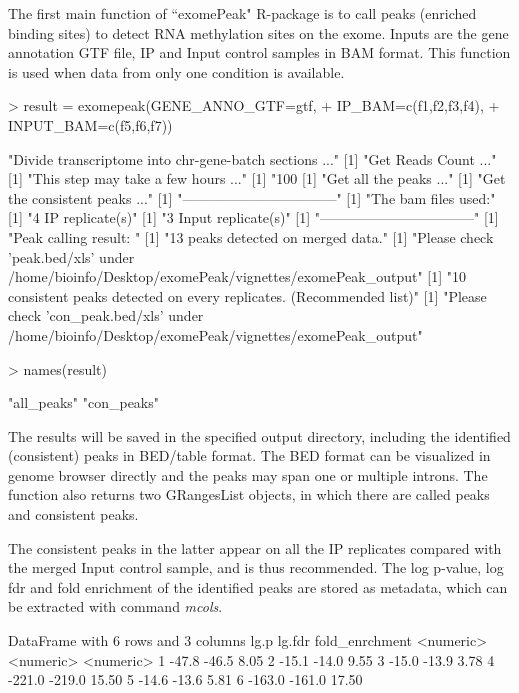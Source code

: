 \documentclass[]{article}
\begin{document}
The first main function of ``exomePeak" R-package is to call peaks (enriched binding sites) to detect RNA methylation sites on the exome. Inputs are the gene annotation GTF file, IP and Input control samples in BAM format. This function is used when data from only one condition is available.

\begin{Schunk}
\begin{Sinput}
> result = exomepeak(GENE_ANNO_GTF=gtf, 
+                    IP_BAM=c(f1,f2,f3,f4), 
+                    INPUT_BAM=c(f5,f6,f7))
\end{Sinput}
\begin{Soutput}
[1] "Divide transcriptome into chr-gene-batch sections ..."
[1] "Get Reads Count ..."
[1] "This step may take a few hours ..."
[1] "100 %"
[1] "Get all the peaks ..."
[1] "Get the consistent peaks ..."
[1] "---------------------------------"
[1] "The bam files used:"
[1] "4 IP replicate(s)"
[1] "3 Input replicate(s)"
[1] "---------------------------------"
[1] "Peak calling result: "
[1] "13 peaks detected on merged data."
[1] "Please check 'peak.bed/xls' under /home/bioinfo/Desktop/exomePeak/vignettes/exomePeak_output"
[1] "10 consistent peaks detected on every replicates. (Recommended list)"
[1] "Please check 'con_peak.bed/xls' under /home/bioinfo/Desktop/exomePeak/vignettes/exomePeak_output"
\end{Soutput}
\begin{Sinput}
> names(result)
\end{Sinput}
\begin{Soutput}
[1] "all_peaks" "con_peaks"
\end{Soutput}
\end{Schunk}

The results will be saved in the specified output directory, including the identified (consistent) peaks in BED/table format. The BED format can be visualized in genome browser directly and the peaks may span one or multiple introns. The function also returns two GRangesList objects, in which there are called peaks and consistent peaks. 

The consistent peaks in the latter appear on all the IP replicates compared with the merged Input control sample, and is thus recommended. The log p-value, log fdr and fold enrichment of the identified peaks are stored as metadata, which can be extracted with command \emph{mcols}.

\begin{Schunk}
\begin{Soutput}
DataFrame with 6 rows and 3 columns
       lg.p    lg.fdr fold_enrchment
  <numeric> <numeric>      <numeric>
1     -47.8     -46.5           8.05
2     -15.1     -14.0           9.55
3     -15.0     -13.9           3.78
4    -221.0    -219.0          15.50
5     -14.6     -13.6           5.81
6    -163.0    -161.0          17.50
\end{Soutput}
\end{Schunk}
\end{document}

